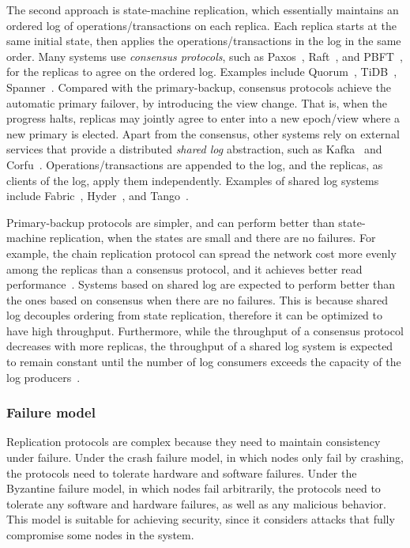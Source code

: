 The second approach is state-machine replication, which essentially maintains an
ordered log of operations/transactions on each replica. Each replica starts at
the same initial state, then applies the operations/transactions in the log in
the same order. Many systems use {\em consensus protocols}, such as
Paxos~\cite{lamport2001paxos}, Raft~\cite{raft}, and
PBFT~\cite{castro1999practical}, for the replicas to agree on the ordered log.
Examples include Quorum~\cite{web:quorum}, TiDB~\cite{web:tidb},
Spanner~\cite{corbett2013spanner}.
Compared with the primary-backup, consensus protocols achieve the automatic
primary failover, by introducing the view change. That is, when the progress
halts, replicas may jointly agree to enter into a new epoch/view where a new
primary is elected.
Apart from the consensus, other systems rely on external services that provide a
distributed {\em shared log} abstraction, such as Kafka~\cite{web:kafka} and
Corfu~\cite{corfu}. Operations/transactions are appended to the log, and the
replicas, as clients of the log, apply them independently.
Examples of shared log systems include Fabric~\cite{web:fabric},
Hyder~\cite{hyder}, and Tango~\cite{tango}.

Primary-backup protocols are simpler, and can perform better than state-machine
replication, when the states are small and there are no failures. For example,
the chain replication protocol can spread the network cost more evenly among the
replicas than a consensus protocol, and it achieves better read
performance~\cite{replex}. Systems based on shared log are expected to perform
better than the ones based on consensus when there are no failures.  This is
because shared log decouples ordering from state replication, therefore it can
be optimized to have high throughput. Furthermore, while the throughput of a
consensus protocol decreases with more replicas, the throughput of a shared log
system is expected to remain constant until the number of log consumers exceeds
the capacity of the log producers~\cite{corfu}. 
 
\subsubsection{Failure model}
\label{ch:twin:taxonomy:replication:failure}
Replication protocols are complex because they need to maintain consistency
under failure. Under the crash failure model, in which nodes only fail by
crashing, the protocols need to tolerate hardware and software failures. Under
the Byzantine failure model, in which nodes fail arbitrarily, the protocols need
to tolerate any software and hardware failures, as well as any malicious
behavior. This model is suitable for achieving security, since it considers
attacks that fully compromise some nodes in the system.

